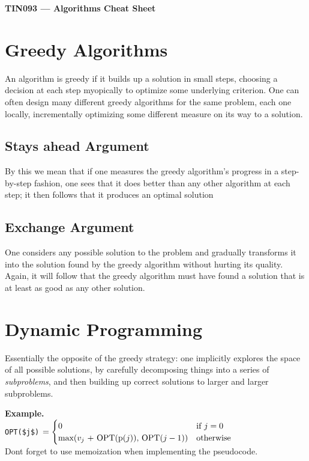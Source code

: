 \documentclass[a4paper,landscape]{article}
\def\title{TIN093 --- Algorithms Cheat Sheet}
\theoremstyle{definition}
\begin{document}
\begin{multicols*}{3}
\begin{center}
	\Large{\textbf{\title}} \\
\end{center}


\section{Greedy Algorithms}
An algorithm is greedy if it builds up a solution in small steps, choosing
a decision at each step myopically to optimize some underlying criterion.
One can often design many different greedy algorithms for the same problem,
each one locally, incrementally optimizing some different measure on its
way to a solution.

\subsection{Stays ahead Argument}
By this we mean that if one measures the greedy algorithm’s progress in a
step-by-step fashion, one sees that it does better than any other algorithm
at each step; it then follows that it produces an optimal solution

\subsection{Exchange Argument}
One considers any possible solution to the problem and gradually transforms
it into the solution found by the greedy algorithm without hurting its
quality.  Again, it will follow that the greedy algorithm must have found a
solution that is at least as good as any other solution.


\section{Dynamic Programming}
Essentially the opposite of the greedy strategy: one implicitly explores
the space of all possible solutions, by carefully decomposing things into a
series of \emph{subproblems}, and then building up correct solutions to
larger and larger subproblems.

\textbf{Example.} \\
\lstinline[mathescape]{OPT($j$)} $=
\begin{cases}
	0                                                            & \text{if $j=0$} \\
	\lstinline[mathescape]{max($v_j$ + OPT(p($j$)), OPT($j-1$))} & \text{otherwise} \\
\end{cases}$ \\
Dont forget to use memoization when implementing the pseudocode.



\end{multicols*}
\end{document}
